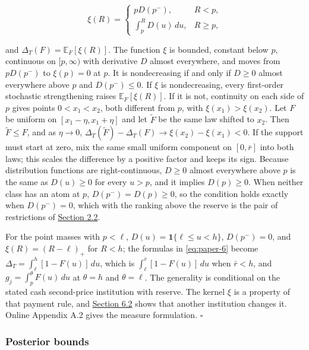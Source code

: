 \[
\xi(R)=
\begin{cases}
pD(p^-), & R<p,\\[3pt]
\int_p^RD(u)\,du, & R\ge p,
\end{cases}
\]

and \(\Delta_T(F)=\mathbb E_F[\xi(R)]\). The function \(\xi\)
is bounded, constant below \(p\), continuous on \([p,\infty)\) with
derivative \(D\) almost everywhere, and moves from \(pD(p^-)\) to
\(\xi(p)=0\) at \(p\). It is nondecreasing if and only if
\(D\ge0\) almost everywhere above \(p\) and \(D(p^-)\le0\). If
\(\xi\) is nondecreasing, every first-order stochastic
strengthening raises \(\mathbb E_F[\xi(R)]\). If it is not,
continuity on each side of \(p\) gives points \(0<x_1<x_2\), both
different from \(p\), with \(\xi(x_1)>\xi(x_2)\). Let \(F\) be
uniform on \([x_1-\eta,x_1+\eta]\) and let \(\tilde F\) be the same law
shifted to \(x_2\). Then \(\tilde F\le F\), and as \(\eta\to0\),
\(\Delta_T(\tilde F)-\Delta_T(F)\to\xi(x_2)-\xi(x_1)<0\). If
the support must start at zero, mix the same small uniform component on
\([0,\bar r]\) into both laws; this scales the difference by a positive
factor and keeps its sign. Because distribution functions are
right-continuous, \(D\ge0\) almost everywhere above \(p\) is the same
as \(D(u)\ge0\) for every \(u>p\), and it implies \(D(p)\ge0\). When
neither class has an atom at \(p\), \(D(p^-)=D(p)\ge0\), so the
condition holds exactly when \(D(p^-)=0\), which with the ranking above
the reserve is the pair of restrictions of
\hyperref[sec-values-preparation-and-the-sale]{Section 2.2}.

For the point masses with \(p<\ell\), \(D(u)=\mathbf1\{\ell\le u<h\}\),
\(D(p^-)=0\), and \(\xi(R)=(R-\ell)_+\) for \(R<h\); the formulas
in \eqref{eq:paper-6} become \(\Delta_T=\int_\ell^h[1-F(u)]\,du\),
which is \(\int_\ell^{\bar r}[1-F(u)]\,du\) when \(\bar r<h\), and
\(g_j=\int_p^\theta F(u)\,du\) at \(\theta=h\) and \(\theta=\ell\). The
generality is conditional on the stated cash second-price institution
with reserve. The kernel \(\xi\) is a property of that payment rule,
and \hyperref[sec-the-payment-rule]{Section 6.2} shows that another
institution changes it. Online Appendix A.2 gives the measure
formulation. \(\square\)


\subsubsection{Posterior bounds}\label{posterior-bounds}

